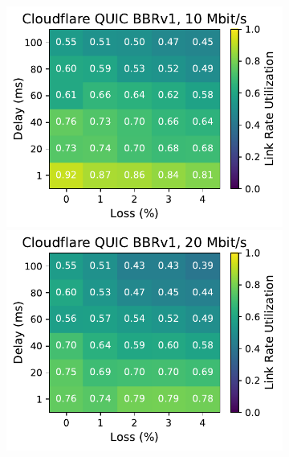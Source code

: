 \begin{figure}[ht]
\begin{subfigure}[b]{0.22\linewidth}
        \includegraphics[width=\linewidth,trim={0 0 2cm 0},clip]{splitting-paper/figures/heatmaps/heatmap_quiche_bbr1_10mbps.pdf}
        \includegraphics[width=\linewidth,trim={0 0 2cm 0},clip]{splitting-paper/figures/heatmaps/heatmap_quiche_bbr1_20mbps.pdf}

\end{subfigure}
\end{figure}
